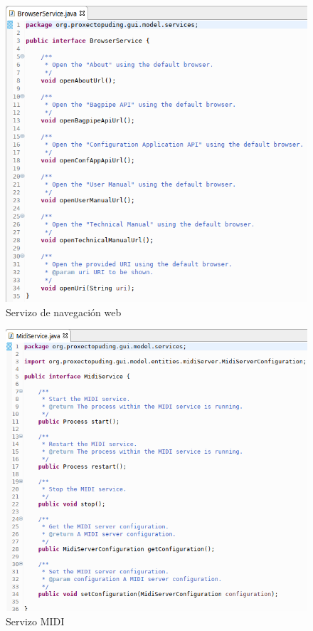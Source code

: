    \begin{figure}[htbp]
    \centering
    \includegraphics[scale=0.6, keepaspectratio=true]{./imagenes/servizo-navegacion.png}
    \caption{Servizo de navegación web}
    \label{figura:ServizoNavegacion}
   \end{figure}
   
   \begin{figure}[htbp]
    \centering
    \includegraphics[scale=0.6, keepaspectratio=true]{./imagenes/servizo-midi.png}
    \caption{Servizo MIDI}
    \label{figura:ServizoMidi}
   \end{figure}
   
